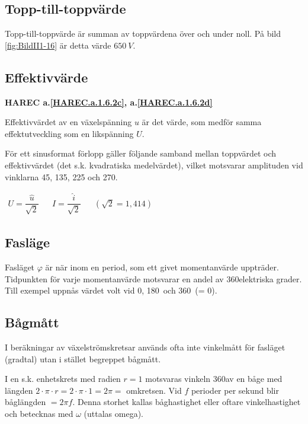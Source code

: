 \subsection{Topp-till-toppvärde}

Topp-till-toppvärde är summan av toppvärdena över och under noll.
På bild \ref{fig:BildII1-16} är detta värde \(650\ V\).

\subsection{Effektivvärde}
\textbf{HAREC a.\ref{HAREC.a.1.6.2c}, a.\ref{HAREC.a.1.6.2d}\label{myHAREC.a.1.6.2c}\label{myHAREC.a.1.6.2d}}

Effektivvärdet av en växelspänning \(u\) är det värde, som medför samma
effektutveckling som en likspänning \(U\).

För ett sinusformat förlopp gäller följande samband mellan toppvärdet och
effektivvärdet (det s.k. kvadratiska medelvärdet), vilket motsvarar amplituden
vid vinklarna 45, 135, 225 och 270\degree.

\(
\begin{array}{lllll}
U=\dfrac{\hat{u}}{\sqrt{2}} & & I=\dfrac{\hat{i}}{\sqrt{2}} & & (\sqrt{2} = 1,414)
\end{array}
\)

\subsection{Fasläge}

Fasläget \(\varphi\) är när inom en period, som ett givet momentanvärde
uppträder.
Tidpunkten för varje momentanvärde motsvarar en andel av 360\degree elektriska
grader.
Till exempel uppnås värdet volt vid 0\degree, 180\degree~och 360\degree~(= 0\degree).

\subsection{Bågmått}

I beräkningar av växelströmskretsar används ofta inte vinkelmått för fasläget
(gradtal) utan i stället begreppet bågmått.

I en s.k. enhetskrets med radien \(r = 1\) motsvaras vinkeln 360\degree av en
båge med längden \(2 \cdot \pi \cdot r= 2 \cdot \pi \cdot 1 = 2 \pi =\)
omkretsen.
Vid \(f\) perioder per sekund blir båglängden \(= 2\pi f\).
Denna storhet kallas båghastighet eller oftare vinkelhastighet och betecknas
med \(\omega\) (uttalas omega).

